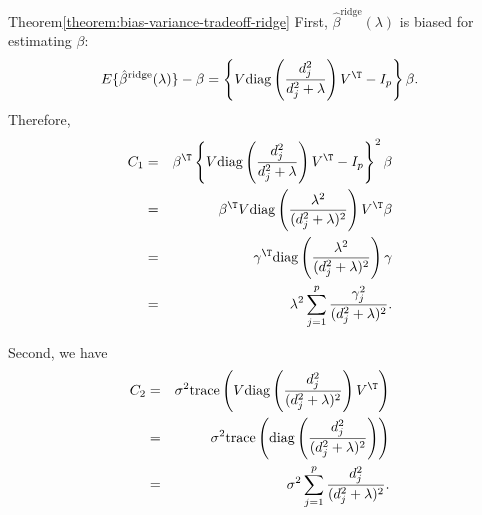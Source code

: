 \begin{myproof}{Theorem}{\ref{theorem:bias-variance-tradeoff-ridge}}
First, $\hat{\beta}^{\text{ridge}}(\lambda)$ is biased for estimating $\beta$:
$$
E\{\hat{\beta}^{\text{ridge}}(\lambda) \} - \beta = 
\left\{ V\text{diag}\left(  \frac{d_j^2}{d_j^2 + \lambda }  \right) V^{\T} - I_p \right\} \beta.
$$
Therefore, 
\begin{eqnarray*}
C_1 &=&     \beta^{\T}      \left\{   V\text{diag}\left(  \frac{d_j^2}{d_j^2 + \lambda }  \right) V^{\T} - I_p   \right\}^2 \beta \\
&=&    \beta^{\T}      V  \text{diag}\left(  \frac{\lambda^2}{ (d_j^2 + \lambda)^2 }  \right)   V^{\T}     \beta \\
&=& \gamma^{\T}  \text{diag}\left(  \frac{\lambda^2}{ (d_j^2 + \lambda)^2 }  \right)   \gamma \\
&=& \lambda^{2}\sum_{j=1}^{p}\frac{\gamma_{j}^{2}}{( d_j^2 +\lambda)^{2}} . 
\end{eqnarray*}


Second, we have 
\begin{eqnarray*}
C_2 &=&  \sigma^2 \text{trace} \left( V\text{diag}\left(  \frac{d_j^2}{(d_j^2 + \lambda)^2 }  \right)   V^{\T} \right) \\
&=& \sigma^2 \text{trace} \left( \text{diag}\left(  \frac{d_j^2}{(d_j^2 + \lambda)^2 }  \right ) \right) \\
&=& \sigma^{2}\sum_{j=1}^{p}\frac{ d_j^2 }{( d_j^2 +\lambda)^{2}}. 
\end{eqnarray*}


\end{myproof}
